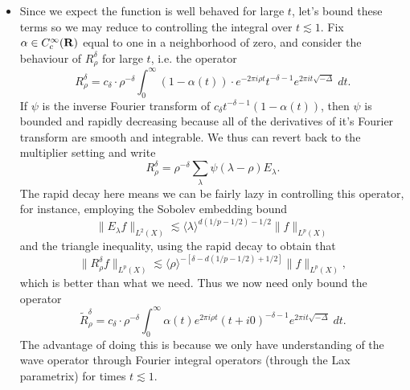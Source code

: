 \begin{itemize}
    \item Since we expect the function is well behaved for large $t$, let's bound these terms so we may reduce to controlling the integral over $t \lesssim 1$. Fix $\alpha \in C_c^\infty(\operatorname{\mathbf{R}})$ equal to one in a neighborhood of zero, and consider the behaviour of $R^\delta_\rho$ for large $t$, i.e. the operator
    \[ R^\delta_\rho = c_\delta \cdot \rho^{-\delta} \int_0^\infty (1 - \alpha(t)) \cdot e^{- 2 \pi i \rho t} t^{-\delta - 1} e^{2 \pi i t \sqrt{-\Delta}}\; dt. \]
    If $\psi$ is the inverse Fourier transform of $c_\delta t^{-\delta-1} (1 - \alpha(t))$, then $\psi$ is bounded and rapidly decreasing because all of the derivatives of it's Fourier transform are smooth and integrable. We thus can revert back to the multiplier setting and write
    \[ R^\delta_\rho = \rho^{-\delta} \sum_\lambda \psi(\lambda - \rho) E_\lambda. \]
    The rapid decay here means we can be fairly lazy in controlling this operator, for instance, employing the Sobolev embedding bound
    \[ \| E_\lambda f \|_{L^2(X)} \lesssim \langle \lambda \rangle^{d(1/p - 1/2) - 1/2} \| f \|_{L^p(X)} \]
    and the triangle inequality, using the rapid decay to obtain that
    \[ \| R^\delta_\rho f \|_{L^p(X)} \lesssim \langle \rho \rangle^{-[\delta - d(1/p - 1/2) + 1/2]} \| f \|_{L^p(X)}, \]
    which is better than what we need. Thus we now need only bound the operator
    \[ \tilde{R}^\delta_\rho = c_\delta \cdot \rho^{-\delta} \int_0^\infty \alpha(t) e^{2 \pi i \rho t} (t + i0)^{-\delta - 1} e^{2 \pi i t \sqrt{-\Delta}}\; dt. \]
    The advantage of doing this is because we only have understanding of the wave operator through Fourier integral operators (through the Lax parametrix) for times $t \lesssim 1$.


\end{itemize}
